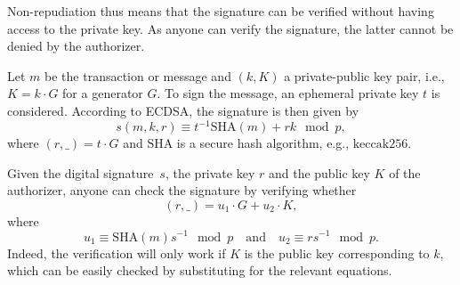 \documentclass{article}
\begin{document}
Non-repudiation thus means that the signature can be verified without having
access to the private key. As anyone can verify the signature, the latter cannot
be denied by the authorizer.

Let $m$ be the transaction or message and $(k, K)$ a private-public key
pair, i.e., $K = k \cdot G$ for a generator $G$. To sign the message, an
ephemeral private key $t$ is considered. According to ECDSA, the
signature is then given by
\begin{equation}
    \label{eq:ecdsa_sig}
    s(m, k, r) \equiv t^{-1} \mathrm{SHA}(m) + rk \mod p,
\end{equation}
where $(r, \_) = t \cdot G$ and $\mathrm{SHA}$ is a secure hash algorithm,
e.g., $\mathrm{keccak256}$.

Given the digital signature~$s$, the private key $r$ and the public key $K$ of
the authorizer, anyone can check the signature by verifying whether
\begin{equation}
    (r, \_) = u_1 \cdot G + u_2 \cdot K, 
\end{equation}
where
\begin{equation}
    u_1 \equiv \mathrm{SHA}(m) s^{-1} \mod p \quad\mathrm{and}\quad
    u_2 \equiv r s^{-1} \mod p.
\end{equation}
Indeed, the verification will only work if $K$ is the public key corresponding
to $k$, which can be easily checked by substituting for the relevant equations.
\end{document}
